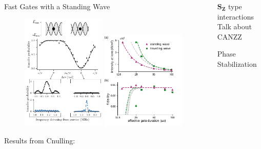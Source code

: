 \documentclass[final]{beamer}
\begin{document}
\begin{frame}{}
\begin{center}
\begin{columns}[t]
\begin{column}{0.49\textwidth}
\begin{alertblock}{Fast Gates with a Standing Wave}
      \begin{figure}
        \includegraphics[width=0.48\textwidth]{./figs/Figure_2_v2.pdf}
        \includegraphics[width=0.48\textwidth]{./figs/two_qubit_gate_figure.pdf}
      \end{figure}

      Results from Cnulling:

    \end{alertblock}

  \end{column}
  \begin{column}{0.49\textwidth}

    \begin{alertblock}{$\mathbf{S_Z}$ type interactions}
      Talk about CANZZ
    \end{alertblock}

    \begin{alertblock}{Phase Stabilization}


\end{alertblock}
\end{column}
\end{columns}
\end{center}
\end{frame}
\end{document}
